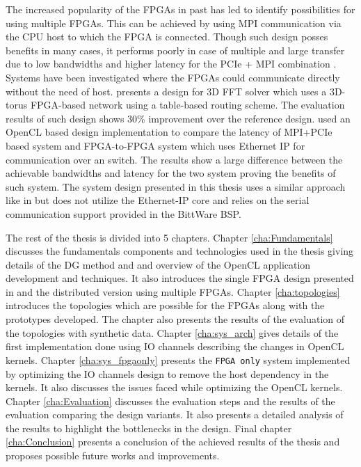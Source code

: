 The increased popularity of the FPGAs in past has led to identify possibilities for
using multiple FPGAs. This can be achieved by using \ac{MPI} communication via the CPU host
to which the FPGA is connected. Though such design posses benefits in many cases,
it performs poorly in case of multiple and large transfer due to low bandwidths
and higher latency for the PCIe + \ac{MPI} combination \cite{kobayashi_opencl-ready_2018}.
Systems have been investigated where the FPGAs could
communicate directly without the need of host. \textcite{sheng_hpc_2017} presents a design
for 3D FFT solver which uses a 3D-torus FPGA-based network using a table-based routing
scheme. The evaluation results of such design shows 30\% improvement over the reference design.
\textcite{kobayashi_opencl-ready_2018} used an OpenCL based design implementation to
compare the latency of \ac{MPI}+PCIe based system and FPGA-to-FPGA system which uses Ethernet
IP for communication over an switch. The results show a large difference between the achievable
bandwidths and latency for the two system proving the benefits of such system. The system
design presented in this thesis uses a similar approach like in \cite{kobayashi_opencl-ready_2018}
but does not utilize the Ethernet-IP core and relies on the serial communication
support provided in the BittWare BSP.

The rest of the thesis is divided into 5 chapters. Chapter \ref{cha:Fundamentals} discusses
the fundamentals components and technologies used in the thesis giving details of the DG method
and and overview of the OpenCL application development and techniques. It also introduces
the single FPGA design presented in \cite{kenter_opencl-based_2018} and the distributed
version using multiple FPGAs. Chapter \ref{cha:topologies} introduces the topologies which
are possible for the FPGAs along with the prototypes developed. The chapter also presents
the results of the evaluation of the topologies with synthetic data. Chapter \ref{cha:sys_arch}
gives details of the first implementation done using IO channels describing
the changes in OpenCL kernels. Chapter \ref{cha:sys_fpgaonly}
presents the \texttt{FPGA only} system implemented by optimizing the IO channels design
to remove the host dependency in the kernels. It also discusses the issues faced while
optimizing the OpenCL kernels. Chapter \ref{cha:Evaluation} discusses the evaluation steps
and the results of the evaluation comparing the design variants. It also presents a detailed
analysis of the results to highlight the bottlenecks in the design.
Final chapter \ref{cha:Conclusion} presents a conclusion of the achieved results of the thesis
and proposes possible future works and improvements.